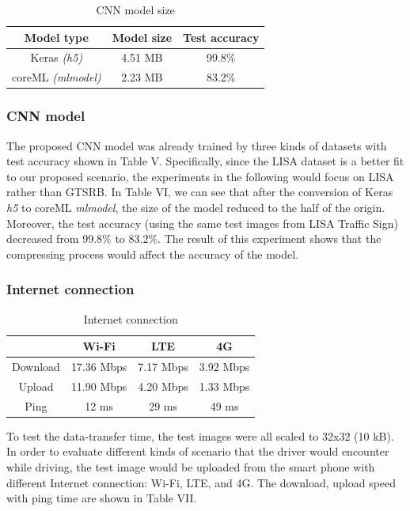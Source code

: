 \documentclass[conference]{IEEEtran}
\begin{document}
\begin{table}[!htb]
\caption{CNN model size}
\begin{center}
\begin{tabular}{|c|c|c|}
\hline
\textbf{Model type} & \textbf{Model size} & \textbf{Test accuracy }\\
\hline
Keras \textit{(h5)} & 4.51 MB & 99.8\% \\
\hline
coreML \textit{(mlmodel)} & 2.23 MB & 83.2\% \\
\hline
\end{tabular}
\label{tab3}
\end{center}
\end{table}

\subsubsection{CNN model}
The proposed CNN model was already trained by three kinds of datasets with test accuracy shown in Table V. Specifically, since the LISA dataset is a better fit to our proposed scenario, the experiments in the following would focus on LISA rather than GTSRB. In Table VI, we can see that after the conversion of Keras \textit{h5} to coreML \textit{mlmodel}, the size of the model reduced to the half of the origin. Moreover, the test accuracy (using the same test images from LISA Traffic Sign) decreased from 99.8\% to 83.2\%. The result of this experiment shows that the compressing process would affect the accuracy of the model.

\subsubsection{Internet connection}
\begin{table}[!htb]
\caption{Internet connection}
\begin{center}
\begin{tabular}{|c|c|c|c|}
\hline
& \textbf{Wi-Fi} & \textbf{LTE} & \textbf{4G}\\
\hline
Download & 17.36 Mbps & 7.17 Mbps & 3.92 Mbps\\
\hline
Upload & 11.90 Mbps & 4.20 Mbps & 1.33 Mbps\\
\hline
Ping & 12 ms & 29 ms & 49 ms\\
\hline
\end{tabular}
\label{tab4}
\end{center}
\end{table}
To test the data-transfer time, the test images were all scaled to 32x32 (10 kB). In order to evaluate different kinds of scenario that the driver would encounter while driving, the test image would be uploaded from the smart phone with different Internet connection: Wi-Fi, LTE, and 4G. The download, upload speed with ping time are shown in Table VII. 
\end{document}
